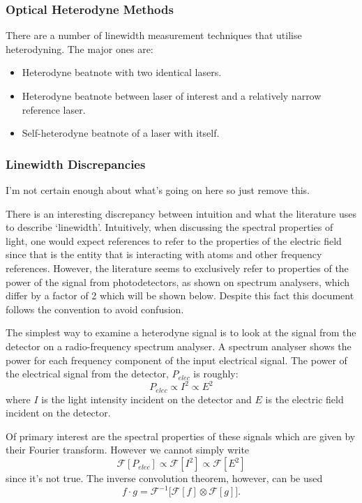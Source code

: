 \subsubsection{Optical Heterodyne Methods}

There are a number of linewidth measurement techniques that utilise heterodyning. The major ones are:
\begin{itemize}
\item Heterodyne beatnote with two identical lasers.
\item Heterodyne beatnote between laser of interest and a relatively narrow reference laser.
\item Self-heterodyne beatnote of a laser with itself.
\end{itemize}

\subsubsection{Linewidth Discrepancies}
{\color{red}I'm not certain enough about what's going on here so just remove this.}

There is an interesting discrepancy between intuition and what the literature uses to describe `linewidth'.
Intuitively, when discussing the spectral properties of light, one would expect references to refer to the properties of the electric field since that is the entity that is interacting with atoms and other frequency references.
However, the literature seems to exclusively refer to properties of the power of the signal from photodetectors, as shown on spectrum analysers, which differ by a factor of 2 which will be shown below.
Despite this fact this document follows the convention to avoid confusion.

The simplest way to examine a heterodyne signal is to look at the signal from the detector on a radio-frequency spectrum analyser.
A spectrum analyser shows the power for each frequency component of the input electrical signal.
The power of the electrical signal from the detector, $P_{elec}$ is roughly:
\begin{equation}
P_{elec}\propto I^2 \propto E^2
\label{eq:beatnote_proportional}
\end{equation}
where $I$ is the light intensity incident on the detector and $E$ is the electric field incident on the detector.

Of primary interest are the spectral properties of these signals which are given by their Fourier transform.
However we cannot simply write
\begin{equation}
\mathcal{F}[P_{elec}]\propto \mathcal{F}[I^2] \propto \mathcal{F}[E^2]
\end{equation}
since it's not true.
The inverse convolution theorem, however, can be used
\begin{equation}
f\cdot g = \mathcal{F}^{-1} \bigg[ \mathcal{F}[f] \otimes\mathcal{F}[g]\bigg].
\end{equation}

